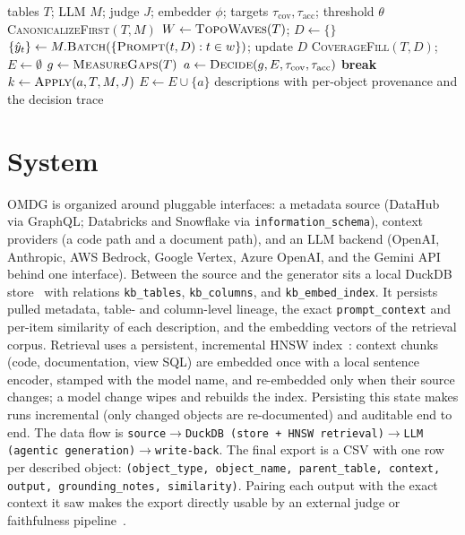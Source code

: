 \begin{algorithm}[t]
\caption{OMDG: canonicalize-first, lineage-aware, controlled agentic generation}\label{alg:main}
\begin{algorithmic}[1]
\Require tables $T$; LLM $M$; judge $J$; embedder $\phi$; targets $\tau_{\text{cov}},\tau_{\text{acc}}$; threshold $\theta$
\State \textsc{CanonicalizeFirst}$(T,M)$ 
\State $W \gets \textsc{TopoWaves}(T)$; \; $D \gets \{\}$ 
 
  \State $\{\hat y_t\} \gets M.\textsc{Batch}(\{\textsc{Prompt}(t,D):t\in w\})$; update $D$
\EndFor
\State \textsc{CoverageFill}$(T,D)$; \; $E \gets \emptyset$ 
  \State $g \gets \textsc{MeasureGaps}(T)$ 
  \State $a \gets \textsc{Decide}(g, E, \tau_{\text{cov}}, \tau_{\text{acc}})$ 
   \textbf{break} \EndIf
  \State $k \gets \textsc{Apply}(a, T, M, J)$ 
   $E \gets E \cup \{a\}$ \EndIf
\EndWhile
\State \Return descriptions with per-object provenance and the decision trace
\end{algorithmic}
\end{algorithm}

\section{System}\label{sec:system}
OMDG is organized around pluggable interfaces: a metadata source (DataHub via GraphQL;
Databricks and Snowflake via \texttt{information\_schema}), context providers (a code path
and a document path), and an LLM backend (OpenAI, Anthropic, AWS Bedrock, Google Vertex,
Azure OpenAI, and the Gemini API behind one interface). Between the source and the
generator sits a local DuckDB store~\citep{raasveldt2019duckdb} with relations
\texttt{kb\_tables}, \texttt{kb\_columns}, and \texttt{kb\_embed\_index}. It persists
pulled metadata, table- and column-level lineage, the exact \texttt{prompt\_context} and
per-item similarity of each description, and the embedding vectors of the retrieval corpus.
Retrieval uses a persistent, incremental HNSW index~\citep{malkov2020hnsw}: context chunks
(code, documentation, view SQL) are embedded once with a local sentence encoder, stamped
with the model name, and re-embedded only when their source changes; a model change wipes
and rebuilds the index. Persisting this state makes runs incremental (only changed objects
are re-documented) and auditable end to end. The data flow is
\texttt{source}$\to$\texttt{DuckDB (store + HNSW retrieval)}$\to$\texttt{LLM (agentic
generation)}$\to$\texttt{write-back}. The final export is a CSV with one row per described
object: \texttt{(object\_type, object\_name, parent\_table, context, output,
grounding\_notes, similarity)}. Pairing each output with the exact context it saw makes the
export directly usable by an external judge or faithfulness pipeline~\citep{es2024ragas}.

